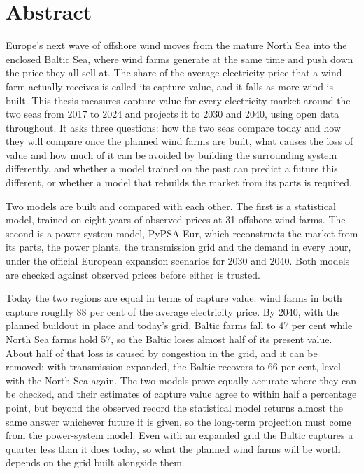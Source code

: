 
\section*{Abstract}

Europe's next wave of offshore wind moves from the mature North Sea into the
enclosed Baltic Sea, where wind farms generate at the same time and push down
the price they all sell at. The share of the average electricity price that a
wind farm actually receives is called its capture value, and it falls as more
wind is built. This thesis measures capture value for every electricity market
around the two seas from 2017 to 2024 and projects it to 2030 and 2040, using
open data throughout. It asks three questions: how the two seas compare today
and how they will compare once the planned wind farms are built, what causes
the loss of value and how much of it can be avoided by building the
surrounding system differently, and whether a model trained on the past can
predict a future this different, or whether a model that rebuilds the market
from its parts is required.

Two models are built and compared with each other. The first is a statistical
model, trained on eight years of observed prices at 31 offshore wind farms.
The second is a power-system model, PyPSA-Eur, which reconstructs the market
from its parts, the power plants, the transmission grid and the demand in
every hour, under the official European expansion scenarios for 2030 and 2040.
Both models are checked against observed prices before either is trusted.

Today the two regions are equal in terms of capture value: wind farms in both capture roughly 88 per cent
of the average electricity price. By 2040, with the planned buildout in place
and today's grid, Baltic farms fall to 47 per cent while North Sea farms hold
57, so the Baltic loses almost half of its present value. About half of that
loss is caused by congestion in the grid, and it can be removed: with
transmission expanded, the Baltic recovers to 66 per cent, level with the
North Sea again. The two models prove equally accurate where they can be
checked, and their estimates of capture value agree to within half a
percentage point, but beyond the observed record the statistical model returns
almost the same answer whichever future it is given, so the long-term
projection must come from the power-system model. Even with an expanded grid
the Baltic captures a quarter less than it does today, so what the planned
wind farms will be worth depends on the grid built alongside them.